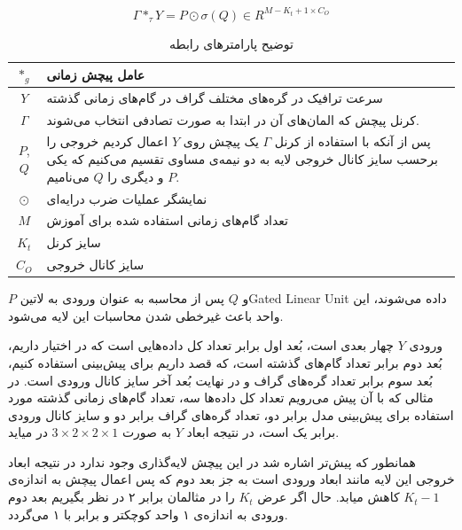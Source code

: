 \documentclass{article}
\begin{document}
\begin{equation}
  \Gamma *_{\tau} Y = P \odot \sigma (Q) \in R^{M-K_{t}+1 \times C_{O}}
  \label{eq:time-conv}
\end{equation}

\begin{table}[h]
  \centering
  \caption{توضیح پارامترهای رابطه }
  \begin{tabular}{|c|p{}|}
    \hline
    $*_{g}$ & عامل پیچش زمانی \\
    \hline
    $Y$ & سرعت ترافیک در گره‌های مختلف گراف در گام‌های زمانی گذشته \\
    \hline
    $\Gamma$ & کرنل پیچش که المان‌های آن در ابتدا به صورت تصادفی انتخاب می‌شوند. \\
    \hline
    $P$, $Q$ & پس از آنکه با استفاده از کرنل $\Gamma$ یک پیچش روی $Y$ اعمال کردیم خروجی را برحسب سایز کانال خروجی لایه به دو نیمه‌ی مساوی تقسیم می‌کنیم که یکی $P$ و دیگری را $Q$ می‌نامیم. \\
    \hline
    $\odot$ & نمایشگر عملیات ضرب درایه‌ای \\
    \hline
    $M$ & تعداد گام‌های زمانی استفاده شده برای آموزش \\
    \hline
    $K_{t}$ & سایز کرنل \\
    \hline
    $C_{O}$ & سایز کانال خروجی \\
    \hline
  \end{tabular}
  \label{tbl:distance}
\end{table}

 $P$ و $Q$ پس از محاسبه به عنوان ورودی به ‌لاتین{Gated Linear Unit} داده می‌شوند، این واحد باعث غیرخطی شدن محاسبات این لایه می‌شود.

ورودی $Y$ چهار بعدی است، بُعد اول برابر تعداد کل داده‌هایی است که در اختیار داریم، بُعد دوم برابر
تعداد گام‌های گذشته است، که قصد داریم برای پیش‌بینی استفاده کنیم،
بُعد سوم برابر تعداد گره‌های گراف و در نهایت بُعد آخر سایز کانال ورودی است.
در مثالی که با آن پیش می‌رویم تعداد کل داده‌ها سه، تعداد گام‌های زمانی گذشته مورد استفاده برای پیش‌بینی مدل برابر دو،
تعداد گره‌های گراف برابر دو و سایز کانال ورودی برابر یک است، در نتیجه ابعاد $Y$ به صورت $ 3 \times 2 \times 2 \times 1 $ در میاید.

همانطور که پیش‌تر اشاره شد در این پیچش لایه‌گذاری وجود ندارد در نتیجه ابعاد خروجی این لایه مانند ابعاد ورودی است به جز بعد دوم
که پس اعمال پیچش به اندازه‌ی $K_{t}-1$ کاهش میابد. حال اگر عرض $K_{t}$ را در مثالمان برابر ۲ در نظر بگیریم
بعد دوم ورودی به اندازه‌ی ۱ واحد کوچکتر و برابر با ۱ می‌گردد.
\end{document}

